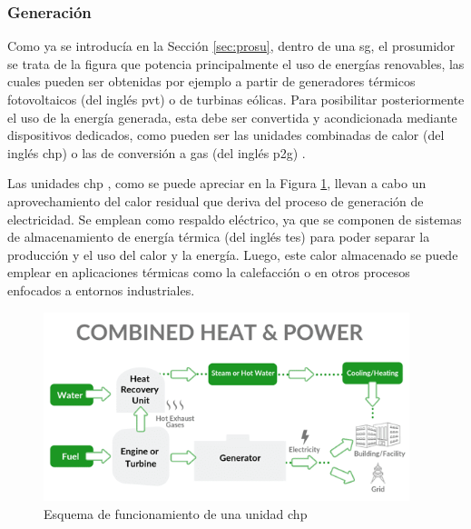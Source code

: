 \subsubsection{Generación}

Como ya se introducía en la Sección \ref{sec:prosu}, dentro de una \gls{sg}, el prosumidor se trata de la figura que potencia principalmente el uso de energías renovables, las cuales pueden ser obtenidas por ejemplo a partir de generadores térmicos fotovoltaicos (del inglés \gls{pvt}) o de turbinas eólicas. Para posibilitar posteriormente el uso de la energía generada, esta debe ser convertida y acondicionada mediante dispositivos dedicados, como pueden ser las unidades combinadas de calor (del inglés \gls{chp}) o las de conversión a gas (del inglés \gls{p2g}) \cite{transactive}.

\vspace{3mm}

Las unidades \gls{chp} \cite{chp} \cite{chp2}, como se puede apreciar en la Figura \ref{fig:chp}, llevan a cabo un aprovechamiento del calor residual que deriva del proceso de generación de electricidad. Se emplean como respaldo eléctrico, ya que se componen de sistemas de almacenamiento de energía térmica (del inglés \gls{tes}) para poder separar la producción y el uso del calor y la energía. Luego, este calor almacenado se puede emplear en aplicaciones térmicas como la calefacción o en otros procesos enfocados a entornos industriales. 

\vspace{3mm}

\begin{figure}[h!]
  \centering
  \includegraphics[width=0.95\textwidth]{img/teoria/chp.png}
  \caption{Esquema de funcionamiento de una unidad \acrshort{chp} \cite{chp}}
  \label{fig:chp}
\end{figure}

\vspace{3mm}


